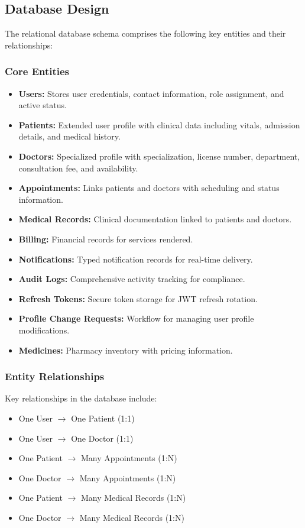\documentclass[conference]{IEEEtran}
\begin{document}
\subsection{Database Design}

The relational database schema comprises the following key entities and their relationships:

\subsubsection{Core Entities}
\begin{itemize}[leftmargin=*]
  \item \textbf{Users:} Stores user credentials, contact information, role assignment, and active status.
  \item \textbf{Patients:} Extended user profile with clinical data including vitals, admission details, and medical history.
  \item \textbf{Doctors:} Specialized profile with specialization, license number, department, consultation fee, and availability.
  \item \textbf{Appointments:} Links patients and doctors with scheduling and status information.
  \item \textbf{Medical Records:} Clinical documentation linked to patients and doctors.
  \item \textbf{Billing:} Financial records for services rendered.
  \item \textbf{Notifications:} Typed notification records for real-time delivery.
  \item \textbf{Audit Logs:} Comprehensive activity tracking for compliance.
  \item \textbf{Refresh Tokens:} Secure token storage for JWT refresh rotation.
  \item \textbf{Profile Change Requests:} Workflow for managing user profile modifications.
  \item \textbf{Medicines:} Pharmacy inventory with pricing information.
\end{itemize}

\subsubsection{Entity Relationships}
Key relationships in the database include:
\begin{itemize}[leftmargin=*]
  \item One User $\rightarrow$ One Patient (1:1)
  \item One User $\rightarrow$ One Doctor (1:1)
  \item One Patient $\rightarrow$ Many Appointments (1:N)
  \item One Doctor $\rightarrow$ Many Appointments (1:N)
  \item One Patient $\rightarrow$ Many Medical Records (1:N)
  \item One Doctor $\rightarrow$ Many Medical Records (1:N)
\end{itemize}
\end{document}
